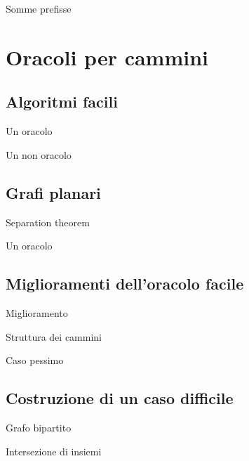 \documentclass{beamer}
\theoremstyle{plain}
\theoremstyle{definition}
\theoremstyle{remark}
\begin{document}
\begin{frame}{Somme prefisse}
  
\end{frame}


\section{Oracoli per cammini}

\subsection{Algoritmi facili}

\begin{frame}{Un oracolo}
  
\end{frame}

\begin{frame}{Un non oracolo}
  
\end{frame}

\subsection{Grafi planari}

\begin{frame}{Separation theorem}
  
\end{frame}

\begin{frame}{Un oracolo}
  
\end{frame}

\subsection{Miglioramenti dell'oracolo facile}

\begin{frame}{Miglioramento}
  
\end{frame}

\begin{frame}{Struttura dei cammini}
  
\end{frame}

\begin{frame}{Caso pessimo}
  
\end{frame}

\subsection{Costruzione di un caso difficile}

\begin{frame}{Grafo bipartito}
  
\end{frame}

\begin{frame}{Intersezione di insiemi}
  
\end{frame}
\end{document}
